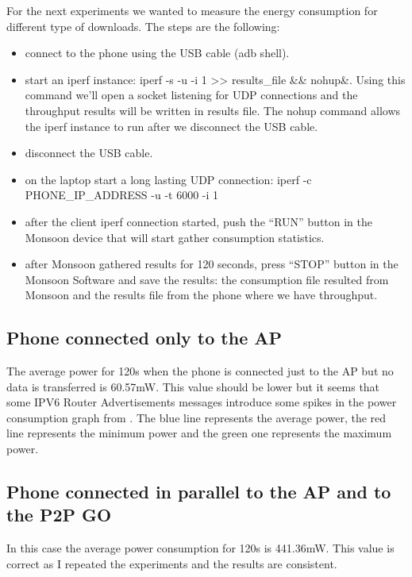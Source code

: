 For the next experiments we wanted to measure the energy consumption for different type of downloads. The steps are the following:
\begin{itemize}
  \item connect to the phone using the USB cable (adb shell).
  \item start an iperf instance: iperf -s -u -i 1 >> results_file \&\& nohup\&. Using this command we'll open a socket listening for UDP connections and the throughput results will be written in results file. The nohup command allows the iperf instance to run after we disconnect the USB cable.
  \item disconnect the USB cable.
  \item on the laptop start a long lasting UDP connection: iperf -c PHONE_IP_ADDRESS -u -t 6000 -i 1
  \item after the client iperf connection started, push the “RUN” button in the Monsoon device that will start gather consumption statistics.
  \item after Monsoon gathered results for 120 seconds, press “STOP” button in the Monsoon Software and save the results: the consumption file resulted from Monsoon and the results file from the phone where we have throughput.
\end{itemize}

\newpage
\subsection{Phone connected only to the AP}
\label{sub-sec:ap-only}
The average power for 120s when the phone is connected just to the AP but no data is transferred is 60.57mW. This value should be lower but it seems that some IPV6 Router Advertisements messages introduce some spikes in the power consumption graph from . The blue line represents the average power, the red line represents the
minimum power and the green one represents the maximum power.


\subsection{Phone connected in parallel to the AP and to the P2P GO}
\label{sub-sec:app2p-parallel}
In this case the average power consumption for 120s is 441.36mW. This value is correct as I repeated the experiments and the results are consistent.

